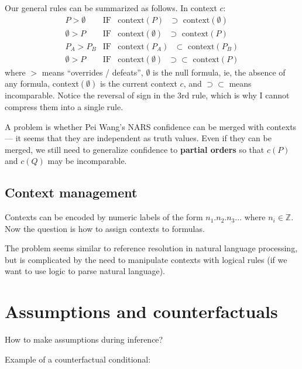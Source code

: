 Our general rules can be summarized as follows.  In context $c$:
\begin{eqnarray}
P > \emptyset & \mbox{IF} & \mbox{context$(P)$ $\supset$ context$(\emptyset)$} \nonumber\\
\emptyset > P & \mbox{IF} & \mbox{context$(\emptyset)$ $\supset$ context$(P)$} \\
P_A > P_B & \mbox{IF} & \mbox{context$(P_A)$ $\subset$ context$(P_B)$} \nonumber\\
\emptyset > P & \mbox{IF} & \mbox{context$(\emptyset)$ $\supset\subset$ context$(P)$} \nonumber
\end{eqnarray}
where $>$ means ``overrides / defeats'', $\emptyset$ is the null formula, ie, the absence of any formula, context$(\emptyset)$ is the current context $c$, and $\supset\subset$ means incomparable.  Notice the reversal of sign in the 3rd rule, which is why I cannot compress them into a single rule.

A problem is whether Pei Wang's NARS confidence can be merged with contexts --- it seems that they are independent as truth values.  Even if they can be merged, we still need to generalize confidence to \textbf{partial orders} so that $c(P)$ and $c(Q)$ may be incomparable.


\subsection{Context management}

Contexts can be encoded by numeric labels of the form $n_1.n_2.n_3...$ where $n_i \in \mathbb{Z}$.  Now the question is how to assign contexts to formulas.

The problem seems similar to reference resolution in natural language processing, but is complicated by the need to manipulate contexts with logical rules (if we want to use logic to parse natural language).

\underconst

\section{Assumptions and counterfactuals}

How to make assumptions during inference?  

Example of a counterfactual conditional:  
